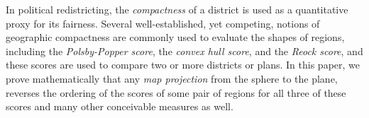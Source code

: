 In political redistricting, the \textit{compactness} of a district is
used as a quantitative proxy for its fairness.  Several
well-established, yet competing, notions of geographic compactness are
commonly used to evaluate the shapes of regions, including the
\textit{Polsby-Popper score}, the \textit{convex hull score}, and the \textit{Reock score}, and
these scores are used to compare two or more districts or plans.  In
this paper, we prove mathematically that  any \textit{map
projection} from the sphere to the plane, reverses the ordering of the scores of some pair of regions for all three of these scores and many other conceivable measures as well.
